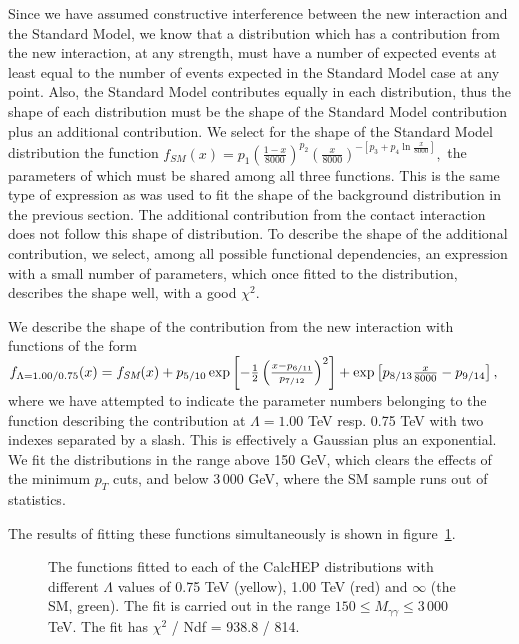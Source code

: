 Since we have assumed constructive interference between the new interaction and the Standard Model, we know that a distribution which has a contribution from the new interaction, at any strength, must have a number of expected events at least equal to the number of events expected in the Standard Model case at any point. Also, the Standard Model contributes equally in each distribution, thus the shape of each distribution must be the shape of the Standard Model contribution plus an additional contribution. We select for the shape of the Standard Model distribution the function
\(f_\textit{SM}(x)=p_1\left(\frac{1-x}{8000}\right)^{p_2}\left(\frac{x}{8000}\right)^{-\left[p_3+p_4\ln\frac{x}{8000}\right]},\)
the parameters of which must be shared among all three functions. This is the same type of expression as was used to fit the shape of the background distribution in the previous section. The additional contribution from the contact interaction does not follow this shape of distribution.
To describe the shape of the additional contribution, we select, among all possible functional dependencies, an expression with a small number of parameters, which once fitted to the distribution, describes the shape well, with a good $\chi^2$.

We describe the shape of the contribution from the new interaction with functions of the form
\(f_{\Lambda=1.00/0.75}(x)=f_\textit{SM}(x)+p_{5/10}\exp\left[-\frac{1}{2}\left(\frac{x-p_{6/11}}{p_{7/12}}\right)^2\right]+\exp\left[p_{8/13}\frac{x}{8000}-p_{9/14}\right],\)
where we have attempted to indicate the parameter numbers belonging to the function describing the contribution at $\Lambda=1.00$ TeV resp. 0.75 TeV with two indexes separated by a slash. This is effectively a Gaussian plus an exponential. We fit the distributions in the range above 150 GeV, which clears the effects of the minimum $p_T$ cuts, and below 3\,000 GeV, where the SM sample runs out of statistics.

The results of fitting these functions simultaneously is shown in figure~\ref{simfit}.


\begin{figure}[hbt]
\begin{infilsf}\tiny

\end{infilsf}
\caption{The functions fitted to each of the CalcHEP distributions with different $\Lambda$ values of 0.75 TeV (yellow), 1.00 TeV (red) and $\infty$ (the SM, green). The fit is carried out in the range $150 \le M_{\gamma\gamma} \le 3\,000$ TeV. The fit has $\chi^2$ / Ndf = 938.8 / 814.}\label{simfit}
\end{figure}

